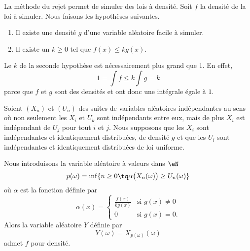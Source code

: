 La méthode du rejet permet de simuler des lois à densité. Soit \( f\) la densité de la loi à simuler. Nous faisons les hypothèses suivantes.
\begin{enumerate}
	\item
	      Il existe une densité \( g\) d'une variable aléatoire facile à simuler.
	\item
	      Il existe un \( k\geq 0\) tel que \( f(x)\leq kg(x)\).
\end{enumerate}

\begin{remark}
	Le \( k\) de la seconde hypothèse est nécessairement plus grand que \( 1\). En effet,
	\begin{equation}
		1=\int f\leq k\int g=k
	\end{equation}
	parce que \( f\) et \( g\) sont des densités et ont donc une intégrale égale à \( 1\).
\end{remark}

\begin{proposition}
	Soient \( (X_n)\) et \( (U_n)\) des suites de variables aléatoires indépendantes au sens où non seulement les \( X_i\) et \( U_k\) sont indépendants entre eux, mais de plus \( X_i\) est indépendant de \( U_j\) pour tout \( i\) et \( j\). Nous supposons que les \( X_i\) sont indépendantes et identiquement distribuées, de densité \( g\) et que les \( U_i\) sont indépendantes et identiquement distribuées de loi uniforme.

	Nous introduisons la variable aléatoire à valeurs dans \( \eN\)
	\begin{equation}
		p(\omega)=\inf\{ n\geq 0\tq \alpha\big( X_n(\omega) \big)\geq U_n(\omega) \}
	\end{equation}
	où \( \alpha\) est la fonction définie par
	\begin{equation}
		\alpha(x)=\begin{cases}
			\frac{ f(x) }{ kg(x) } & \text{si } g(x)\neq 0 \\
			0                      & \text{si } g(x)=0.
		\end{cases}
	\end{equation}
	Alors la variable aléatoire \( Y\) définie par
	\begin{equation}
		Y(\omega)=X_{p(\omega)}(\omega)
	\end{equation}
	admet \( f\) pour densité.
\end{proposition}

